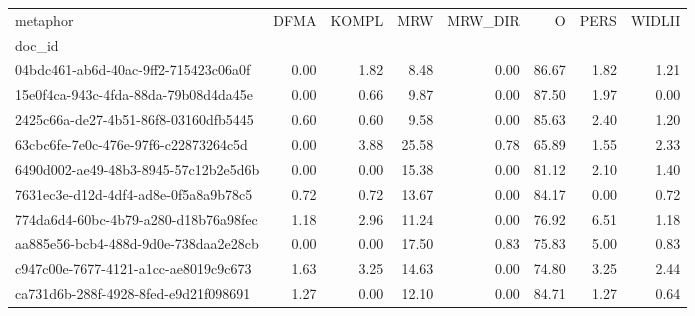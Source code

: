 \begin{tabular}{lrrrrrrr}
\toprule
metaphor & DFMA & KOMPL & MRW & MRW\_DIR & O & PERS & WIDLII \\
doc_id &  &  &  &  &  &  &  \\
\midrule
04bdc461-ab6d-40ac-9ff2-715423c06a0f & 0.00 & 1.82 & 8.48 & 0.00 & 86.67 & 1.82 & 1.21 \\
15e0f4ca-943c-4fda-88da-79b08d4da45e & 0.00 & 0.66 & 9.87 & 0.00 & 87.50 & 1.97 & 0.00 \\
2425c66a-de27-4b51-86f8-03160dfb5445 & 0.60 & 0.60 & 9.58 & 0.00 & 85.63 & 2.40 & 1.20 \\
63cbc6fe-7e0c-476e-97f6-c22873264c5d & 0.00 & 3.88 & 25.58 & 0.78 & 65.89 & 1.55 & 2.33 \\
6490d002-ae49-48b3-8945-57c12b2e5d6b & 0.00 & 0.00 & 15.38 & 0.00 & 81.12 & 2.10 & 1.40 \\
7631ec3e-d12d-4df4-ad8e-0f5a8a9b78c5 & 0.72 & 0.72 & 13.67 & 0.00 & 84.17 & 0.00 & 0.72 \\
774da6d4-60bc-4b79-a280-d18b76a98fec & 1.18 & 2.96 & 11.24 & 0.00 & 76.92 & 6.51 & 1.18 \\
aa885e56-bcb4-488d-9d0e-738daa2e28cb & 0.00 & 0.00 & 17.50 & 0.83 & 75.83 & 5.00 & 0.83 \\
c947c00e-7677-4121-a1cc-ae8019c9c673 & 1.63 & 3.25 & 14.63 & 0.00 & 74.80 & 3.25 & 2.44 \\
ca731d6b-288f-4928-8fed-e9d21f098691 & 1.27 & 0.00 & 12.10 & 0.00 & 84.71 & 1.27 & 0.64 \\
\bottomrule
\end{tabular}
